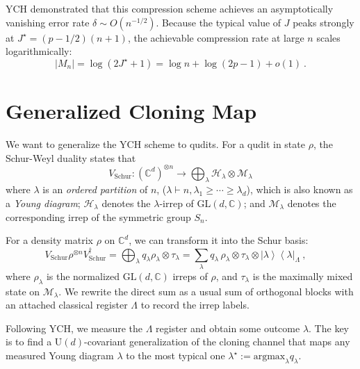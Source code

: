 \documentclass[a4paper,onecolumn,11pt]{quantumarticle}
\newcommand{\ketbra}[2]{\left|#1\right\rangle\!\!\left\langle #2\right|}
\def\h{\mathcal{H}}
\def\map{\mathcal}
\begin{document}
YCH demonstrated that this compression scheme achieves an asymptotically vanishing error rate $\delta \sim O(n^{-1/2})$. Because the typical value of $J$ peaks strongly at $J^\star = (p-1/2)(n+1)$, the achievable compression rate at large $n$ scales logarithmically:
\begin{equation}\label{eq:achievable_qubit}
    |M_n|=\log (2J^\star+1) = \log n + \log (2p-1) + o(1)\ .
\end{equation}


\section{Generalized Cloning Map}\label{sec:cloner}

We want to generalize the YCH scheme to qudits. For a qudit in state $\rho$, the Schur-Weyl duality states that
\begin{equation}
    V_\mathrm{Schur}: (\mathbb C^d)^{\otimes n}\to\bigoplus_\lambda\h_\lambda\otimes\map{M}_\lambda
\end{equation}
where $\lambda$ is an \emph{ordered partition} of $n$, ($\lambda\vdash n, \lambda_1\ge\cdots\ge\lambda_d $), which is also known as a \emph{Young diagram}; $\h_\lambda$ denotes the $\lambda$-irrep of GL$(d,\mathbb{C})$; and $\map{M}_\lambda$ denotes the corresponding irrep of the symmetric group $S_n$.

For a density matrix $\rho$ on $\mathbb{C}^d$, we can transform it into the Schur basis:
\begin{equation}\label{eq:schur_d}
    V_\mathrm{Schur}\rho^{\otimes n}V_\mathrm{Schur}^\dagger= \bigoplus_\lambda q_\lambda \rho_\lambda\otimes \tau_\lambda=\sum_\lambda q_\lambda\, \rho_\lambda\otimes \tau_\lambda\otimes\ketbra{\lambda}{\lambda}_\Lambda\ ,\quad
\end{equation}
where $\rho_\lambda$ is the normalized $\mathrm{GL}(d,\mathbb{C})$ irreps of $\rho$, and $\tau_\lambda$ is the maximally mixed state on $\map{M}_\lambda$. We rewrite the direct sum as a usual sum of orthogonal blocks with an attached classical register $\Lambda$ to record the irrep labels. 

Following YCH, we measure the $\Lambda$ register and obtain some outcome $\lambda$. The key is to find a $\mathrm{U}(d)$-covariant generalization of the cloning channel that maps any measured Young diagram $\lambda$ to the most typical one $\lambda^\star:=\mathrm{argmax}_\lambda q_\lambda$.\\
\end{document}
